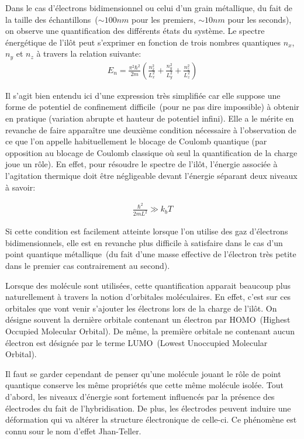 Dans le cas d'électrons bidimensionnel ou celui d'un grain métallique, du fait de la taille des échantillons~($\sim 100nm$ pour les premiers, $\sim 10nm$ pour les seconds), on observe une quantification des différents états du système. Le spectre énergétique de l'il\^ot peut s'exprimer en fonction de trois nombres quantiques $n_x$, $n_y$ et $n_z$ à travers la relation suivante:
\begin{eqnarray}
E_n = \frac{\pi^2 \hbar^2}{2m}(\frac{n_x^2}{L_x^2} + \frac{n_y^2}{L_y^2} + \frac{n_z^2}{L_z^2}) \nonumber
\end{eqnarray}


Il s'agit bien entendu ici d'une expression très simplifiée car elle suppose une forme de potentiel de confinement difficile~(pour ne pas dire impossible) à obtenir en pratique (variation abrupte et hauteur de potentiel infini). Elle a le mérite en revanche de faire appara\^itre une deuxième condition nécessaire à l'observation de ce que l'on appelle habituellement le blocage de Coulomb quantique (par opposition au blocage de Coulomb classique où seul la quantification de la charge joue un rôle). En effet, pour résoudre le spectre de l'il\^ot, l'énergie associée à l'agitation thermique doit \^etre négligeable devant l'énergie séparant deux niveaux à savoir:

\begin{eqnarray}
\frac{\hbar^2}{2mL^2} \gg k_bT \nonumber
\end{eqnarray}

Si cette condition est facilement atteinte lorsque l'on utilise des gaz d'électrons bidimensionnels, elle est en revanche plus difficile à satisfaire dans le cas d'un point quantique métallique~(du fait d'une masse effective de l'électron très petite dans le premier cas contrairement au second). \newline


Lorsque des molécule sont utilisées, cette quantification apparait beaucoup plus naturellement à travers la notion d'orbitales moléculaires. En effet, c'est sur ces orbitales que vont venir s'ajouter les électrons lors de la charge de l'il\^ot. On désigne souvent la dernière orbitale contenant un électron par HOMO~(Highest Occupied Molecular Orbital). De même, la première orbitale ne contenant aucun électron est désignée par le terme LUMO~(Lowest Unoccupied Molecular Orbital).

Il faut se garder cependant de penser qu'une molécule jouant le r\^ole de point quantique conserve les m\^eme propriétés que cette m\^eme molécule isolée. Tout d'abord, les niveaux d'énergie sont fortement influencés par la présence des électrodes du fait de l'hybridisation. De plus, les électrodes peuvent induire une déformation qui va altérer la structure électronique de celle-ci. Ce phénomène est connu sour le nom d'effet Jhan-Teller. 

